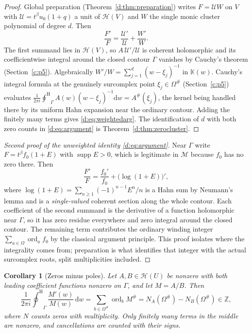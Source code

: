 \documentclass[11pt,a4paper]{article}
\numberwithin{equation}{section}
\newtheorem{corollary}[theorem]{Corollary}
\theoremstyle{definition}
\theoremstyle{remark}
\theoremstyle{plain}
\newcommand{\K}{\mathbb K}
\newcommand{\ZZ}{\mathbb Z}
\DeclareMathOperator{\supp}{supp}
\DeclareMathOperator{\ord}{ord}
\newcommand{\tm}{t}
\newcommand{\halo}[1]{#1^{\#}}
\newcommand{\ev}[1]{#1^{\#}}
\newcommand{\Hc}{\mathcal H}
\newcommand{\Mc}{\mathcal M}
\newcommand{\ointH}{{\oint^{\mathrm H}}}
\newcommand{\dd}{\mathrm d}
\begin{document}
\begin{proof}
Global preparation (Theorem~\ref{d:thm:preparation}) writes
$F=\mathcal U W$ on $V$ with $\mathcal U=\tm^{\beta}u_0(1+q)$ a unit of
$\Hc(V)$ and $W$ the single monic cluster polynomial of degree $d$.
Then
\[
 \frac{F'}{F}=\frac{\mathcal U'}{\mathcal U}+\frac{W'}{W}.
\]
The first summand lies in $\Hc(V)$, so $A\,\mathcal U'/\mathcal U$ is
coherent holomorphic and its coefficientwise integral around the closed
contour $\Gamma$ vanishes by Cauchy's theorem (Section~\ref{c:p5}).  Algebraically
$W'/W=\sum_{j=1}^{d}(w-\xi_j)^{-1}$ in $\K(w)$.  Cauchy's integral
formula at the genuinely surcomplex point $\xi_j\in\halo\Omega$
(Section~\ref{c:p5}) evaluates
$\frac1{2\pi i}\ointH_\Gamma A(w)(w-\xi_j)^{-1}\dd w=\ev A(\xi_j)$, the
kernel being handled there by its uniform Hahn expansion near the
ordinary contour.  Adding the finitely many terms gives
\eqref{d:eq:weightedarg}.  The identification of $d$ with both zero
counts in \eqref{d:eq:argument} is
Theorem~\ref{d:thm:zerocluster}.
\end{proof}

\begin{proof}[Second proof of the unweighted identity \eqref{d:eq:argument}]
Near $\Gamma$ write $F=\tm^{\beta}f_0(1+E)$ with $\supp E>0$, which is
legitimate in $\Mc$ because $f_0$ has no zero there.  Then
\[
 \frac{F'}{F}=\frac{f_0'}{f_0}+\bigl(\log(1+E)\bigr)',
\]
where $\log(1+E)=\sum_{n\ge1}(-1)^{n-1}E^{n}/n$ is a Hahn sum by
Neumann's lemma and is a \emph{single-valued} coherent section along the
whole contour.  Each coefficient of the second summand is the derivative
of a function holomorphic near $\Gamma$, so it has zero residue
everywhere and zero integral around the closed contour.  The remaining
term contributes the ordinary winding integer
$\sum_{a\in\Omega}\ord_af_0$ by the classical argument principle.  This
proof isolates where the integrality comes from; preparation is what
identifies that integer with the actual surcomplex roots, split
multiplicities included.
\end{proof}

\begin{corollary}[Zeros minus poles]
\label{d:cor:zerosminuspoles}
Let $A,B\in\Hc(U)$ be nonzero with both leading coefficient functions
nonzero on $\Gamma$, and let $M=A/B$.  Then
\[
 \frac1{2\pi i}\ointH_{\Gamma}\frac{M'(w)}{M(w)}\,\dd w
  =\sum_{b\in\halo\Omega}\ord_b\ev M
  =N_A(\halo\Omega)-N_B(\halo\Omega)\in\ZZ,
\]
where $N$ counts zeros with multiplicity.  Only finitely many terms in
the middle are nonzero, and cancellations are counted with their signs.
\end{corollary}
\end{document}

